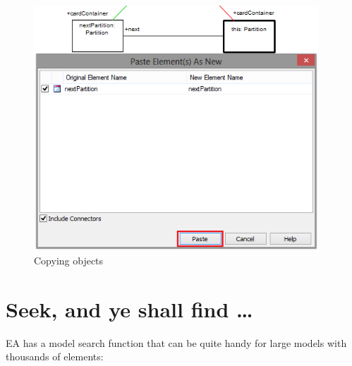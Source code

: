 \begin{figure}[htbp]
\begin{center}
  \includegraphics[width=0.95\textwidth]{pics/tricks/copy/copy1}
  \caption{Copying objects}  
  \label{fig_copy01}
\end{center}
\end{figure}


\section{Seek, and ye shall find \ldots}
EA has a model search function that can be quite handy for large models with thousands of elements:

